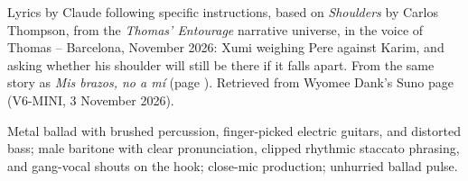 
\label{sec:when-it-falls-apart}
\begin{notes}
Lyrics by Claude following specific instructions, based on \emph{Shoulders} by Carlos Thompson, from the \emph{Thomas' Entourage} narrative universe, in the voice of Thomas -- Barcelona, November 2026: Xumi weighing Pere against Karim, and asking whether his shoulder will still be there if it falls apart. From the same story as \emph{Mis brazos, no a mí} (page \pageref{sec:mis-brazos-no-a-mi}). Retrieved from Wyomee Dank's Suno page (V6-MINI, 3 November 2026).
\end{notes}
\begin{style}
Metal ballad with brushed percussion, finger-picked electric guitars, and distorted bass; male baritone with clear pronunciation, clipped rhythmic staccato phrasing, and gang-vocal shouts on the hook; close-mic production; unhurried ballad pulse.
\end{style}
